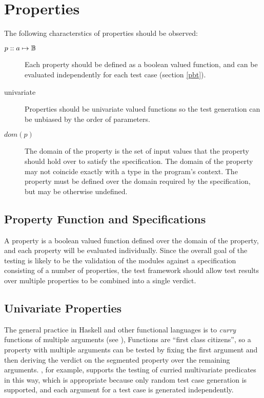 \section {Properties}
The following characterstics of properties should be observed:

\begin{description}
\item[$p :: a \mapsto \mathbb{B}$] 
Each property should be defined as a boolean valued function,
and can be evaluated independently for each test case (section \ref{pbt}).
\item[univariate] Properties should be univariate valued functions
so the test generation can be unbiased by the order of parameters.
\item[$dom(p)$] The domain of the property is the set of input values
that the property should hold over to satisfy the specification.
The domain of the property may not coincide exactly with a type in the program's context.
The property must be defined over the domain required by the specification, but may be otherwise undefined.
\end{description}

\subsection{Property Function and Specifications}
A property is a boolean valued function
defined over the domain of the property,
and each property will be evaluated individually.
Since the overall goal of the testing is 
likely to be the validation of the modules against a 
specification consisting of a number of properties,
the test framework should allow test results
over multiple properties to be combined into a single verdict.

\subsection{Univariate Properties}
The general practice in Haskell and other functional languages
is to \emph{curry} functions of multiple arguments (see \cite{Haskell2010}),
Functions are ``first class citizens'',
so a property with multiple arguments
can be tested by fixing the first argument and 
then deriving the verdict on the segmented property over the remaining arguments.
\QC, for example, supports the testing of curried multivariate predicates in this way,
which is appropriate because only random test case generation is supported,
and each argument for a test case is generated independently.

